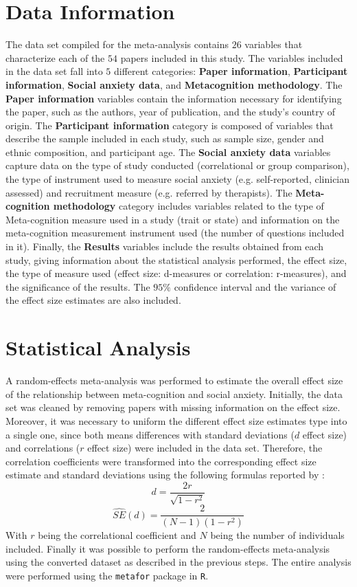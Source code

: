\section*{Data Information}
The data set compiled for the meta-analysis contains $26$ variables that characterize each of the $54$ papers included in this study. The variables included in the data set fall into $5$ different categories: \textbf{Paper information}, \textbf{Participant information}, \textbf{Social anxiety data}, and \textbf{Metacognition methodology}.
The \textbf{Paper information} variables contain the information necessary for identifying the paper, such as the authors, year of publication, and the study's country of origin. 
The \textbf{Participant information} category is composed of variables that describe the sample included in each study, such as sample size, gender and ethnic composition, and participant age.
The \textbf{Social anxiety data} variables capture data on the type of study conducted (correlational or group comparison), the type of instrument used to measure social anxiety (e.g. self-reported, clinician assessed) and recruitment measure (e.g. referred by therapists).
The \textbf{Meta-cognition methodology} category includes variables related to the type of Meta-cognition measure used in a study (trait or state) and information on the meta-cognition measurement instrument used (the number of questions included in it).
Finally, the \textbf{Results} variables include the results obtained from each study, giving information about the statistical analysis performed, the effect size, the type of measure used (effect size: d-measures or correlation: r-measures), and the significance of the results.
The $95\%$ confidence interval and the variance of the effect size estimates are also included.

\section*{Statistical Analysis}
A random-effects meta-analysis was performed to estimate the overall effect size of the relationship between meta-cognition and social anxiety.
Initially, the data set was cleaned by removing papers with missing information on the effect size.
Moreover, it was necessary to uniform the different effect size estimates type into a single one, since both means differences with standard deviations ($d$ effect size) and correlations ($r$ effect size) were included in the data set.
Therefore, the correlation coefficients were transformed into the corresponding effect size estimate and standard deviations using the following formulas reported by \cite{mathur_simple_2020}:
$$d = \frac{2r}{\sqrt{1 - r^2}}$$
$$\hat{SE}(d) = \frac{2}{(N-1)(1 - r^2)}$$
With $r$ being the correlational coefficient and $N$ being the number of individuals included.
Finally it was possible to perform the random-effects meta-analysis using the converted dataset as described in the previous steps.
The entire analysis were performed using the \texttt{metafor} package in \texttt{R}.